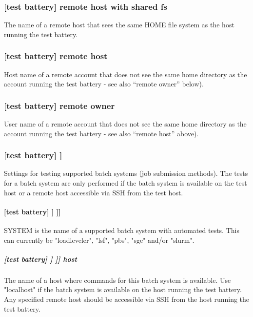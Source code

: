 \subsubsection[remote host with shared fs]{[test battery] \textrightarrow remote host with shared fs}

The name of a remote host that sees the same HOME file system as the host running the
test battery.

\subsubsection[remote host]{[test battery] \textrightarrow remote host}

Host name of a remote account that does not see the same home directory as
the account running the test battery - see also ``remote owner'' below).

\subsubsection[remote owner]{[test battery] \textrightarrow remote owner}

User name of a remote account that does not see the same home directory as the
account running the test battery - see also ``remote host'' above).

\subsubsection[{[[}batch systems{]]}]{[test battery] \textrightarrow [[batch systems]]}

Settings for testing supported batch systems (job submission methods). The
tests for a batch system are only performed if the batch system is available on
the test host or a remote host accessible via SSH from the test host.

\paragraph[{[[[}SYSTEM{]]]}]{[test battery] \textrightarrow [[batch systems]] \textrightarrow [[[SYSTEM]]]}

SYSTEM is the name of a supported batch system with automated tests.
This can currently be "loadleveler", "lsf", "pbs", "sge" and/or "slurm".

\subparagraph[host]{[test battery] \textrightarrow [[batch systems]] \textrightarrow [[[SYSTEM]]] \textrightarrow host}

The name of a host where commands for this batch system is available. Use
"localhost" if the batch system is available on the host running the test
battery. Any specified remote host should be accessible via SSH from the host
running the test battery.

